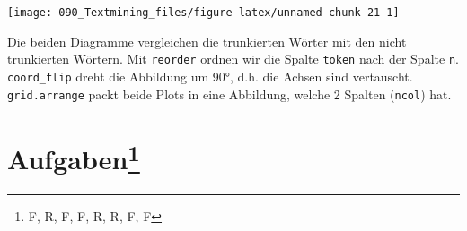 \documentclass[12pt,ngerman,]{book}
\makeatletter
\newenvironment{Shaded}{\begin{snugshade}}{\end{snugshade}}
\newcommand{\KeywordTok}[1]{\textcolor[rgb]{0.13,0.29,0.53}{\textbf{#1}}}
\newcommand{\DataTypeTok}[1]{\textcolor[rgb]{0.13,0.29,0.53}{#1}}
\newcommand{\DecValTok}[1]{\textcolor[rgb]{0.00,0.00,0.81}{#1}}
\newcommand{\StringTok}[1]{\textcolor[rgb]{0.31,0.60,0.02}{#1}}
\newcommand{\OtherTok}[1]{\textcolor[rgb]{0.56,0.35,0.01}{#1}}
\newcommand{\OperatorTok}[1]{\textcolor[rgb]{0.81,0.36,0.00}{\textbf{#1}}}
\newcommand{\NormalTok}[1]{#1}
\let\rmarkdownfootnote\footnote%
\def\footnote{\protect\rmarkdownfootnote}
\newenvironment{kframe}{%
\medskip{}
\setlength{\fboxsep}{.8em}
 \def\at@end@of@kframe{}%
 \ifinner\ifhmode%
  \def\at@end@of@kframe{\end{minipage}}%
  \begin{minipage}{\columnwidth}%
 \fi\fi%
 \def\FrameCommand##1{\hskip\@totalleftmargin \hskip-\fboxsep
 \colorbox{shadecolor}{##1}\hskip-\fboxsep
     \hskip-\linewidth \hskip-\@totalleftmargin \hskip\columnwidth}%
 \MakeFramed {\advance\hsize-\width
   \@totalleftmargin\z@ \linewidth\hsize
   \@setminipage}}%
 {\par\unskip\endMakeFramed%
 \at@end@of@kframe}
\renewenvironment{Shaded}{\begin{kframe}}{\end{kframe}}
\theoremstyle{definition}
\theoremstyle{definition}
\theoremstyle{remark}
\makeatother
\begin{document}
\begin{Shaded}
\end{Shaded}

\begin{center}\texttt{[image: 090\_Textmining\_files/figure-latex/unnamed-chunk-21-1]} \end{center}

Die beiden Diagramme vergleichen die trunkierten Wörter mit den nicht
trunkierten Wörtern. Mit \texttt{reorder} ordnen wir die Spalte
\texttt{token} nach der Spalte \texttt{n}. \texttt{coord\_flip} dreht
die Abbildung um 90°, d.h. die Achsen sind vertauscht.
\texttt{grid.arrange} packt beide Plots in eine Abbildung, welche 2
Spalten (\texttt{ncol}) hat.

\section[Aufgaben]{\texorpdfstring{Aufgaben\footnote{F, R, F, F, R, R,
  F, F}}{Aufgaben}}\label{aufgaben-18}
\end{document}
